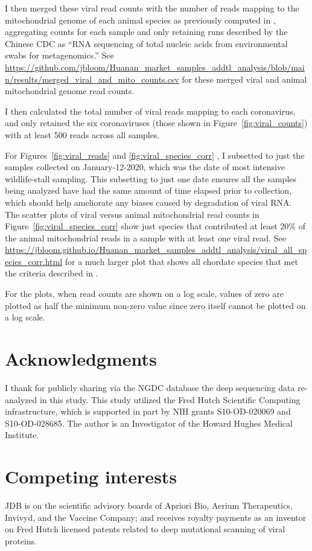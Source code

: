 \documentclass[9pt,onecolumn,twoside]{gsajnl_modified}
\begin{document}
{I then merged these viral read counts with the number of reads mapping to the mitochondrial genome of each animal species as previously computed in \citet{bloom2023association}, aggregating counts for each sample and only retaining runs described by the Chinese CDC as ``RNA sequencing of total nucleic acids from environmental swabs for metagenomics.''
See \url{https://github.com/jbloom/Huanan_market_samples_addtl_analysis/blob/main/results/merged_viral_and_mito_counts.csv} for these merged viral and animal mitochondrial genome read counts.

I then calculated the total number of viral reads mapping to each coronavirus, and only retained the six coronaviruses (those shown in Figure~\ref{fig:viral_counts}) with at least 500 reads across all samples.

For Figures~\ref{fig:viral_reads} and \ref{fig:viral_species_corr} , I subsetted to just the samples collected on January-12-2020, which was the date of most intensive wildlife-stall sampling.
This subsetting to just one date ensures all the samples being analyzed have had the same amount of time elapsed prior to collection, which should help ameliorate any biases caused by degradation of viral RNA.
The scatter plots of viral versus animal mitochondrial read counts in Figure~\ref{fig:viral_species_corr} show just species that contributed at least 20\% of the animal mitochondrial reads in a sample with at least one viral read.
See \url{https://jbloom.github.io/Huanan_market_samples_addtl_analysis/viral_all_species_corr.html} for a much larger plot that shows all chordate species that met the criteria described in \citet{bloom2023association}.

For the plots, when read counts are shown on a log scale, values of zero are plotted as half the minimum non-zero value since zero itself cannot be plotted on a log scale.

\section{Acknowledgments}
I thank \citet{liu2023surveillance} for publicly sharing via the NGDC database the deep sequencing data re-analyzed in this study.
This study utilized the Fred Hutch Scientific Computing infrastructure, which is supported in part by NIH grants S10-OD-020069 and S10-OD-028685.
The author is an Investigator of the Howard Hughes Medical Institute.

\section{Competing interests}
JDB is on the scientific advisory boards of Apriori Bio, Aerium Therapeutics, Invivyd, and the Vaccine Company; and receives royalty payments as an inventor on Fred Hutch licensed patents related to deep mutational scanning of viral proteins.

}
\end{document}
